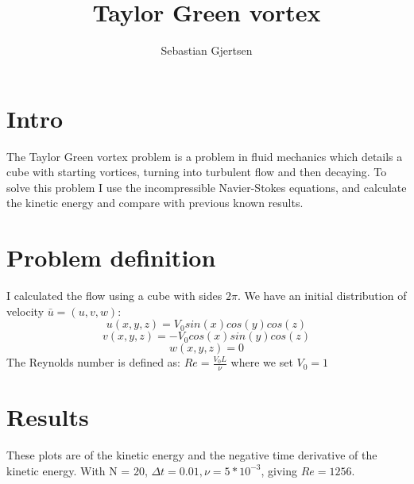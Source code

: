 \documentclass[a4paper,norsk]{article}
\title{Taylor Green vortex}
\author{Sebastian Gjertsen}
\begin{document}
\maketitle
\section*{Intro}
The Taylor Green vortex problem is a problem in fluid mechanics which details a cube with starting vortices, turning into turbulent flow and then decaying. To solve this problem I use the incompressible Navier-Stokes equations, and calculate the kinetic energy and compare with previous known results.


\section*{Problem definition}
I calculated the flow using a cube with sides $2\pi$. \newline
We have an initial distribution of velocity $\bar{u} = (u,v,w)$:
$$  u(x,y,z) = V_0sin(x)cos(y)cos(z) $$
$$  v(x,y,z) = - V_0cos(x)sin(y)cos(z)  $$
$$  w(x,y,z) = 0  $$
The Reynolds number is defined as: $Re = \frac{V_0 L}{\nu}$ where we set $V_0 = 1$



\section{Results}
These plots are of the kinetic energy and the negative time derivative of the kinetic energy. With N = 20, $\Delta t = 0.01, \nu = 5*10^{-3}$, giving $ Re = 1256  $.
\end{document}
